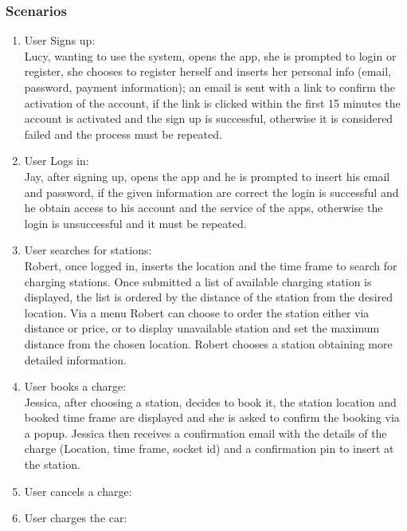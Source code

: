 \subsubsection{Scenarios}
\begin{enumerate}[label=S\arabic*]
      \item User Signs up:\\
            Lucy, wanting to use the system, opens the app, she is prompted to login or register,
            she chooses to register herself and inserts her personal info (email, password, payment information);
            an email is sent with a link to confirm the activation of the account, if the link is clicked within
            the first 15 minutes the account is activated and the sign up is successful,
            otherwise it is considered failed and the process must be repeated.
      \item User Logs in:\\
            Jay, after signing up, opens the app and he is prompted to insert his email and password,
            if the given information are correct the login is successful and he obtain access to his account
            and the service of the apps, otherwise the login is unsuccessful and it must be repeated.
      \item User searches for stations:\\
            Robert, once logged in, inserts the location and the time frame to search for charging stations.
            Once submitted a list of available charging station is displayed, the list is ordered by the distance of the station
            from the desired location. Via a menu Robert can choose to order the station either via distance or price,
            or to display unavailable station and set the maximum distance from the chosen location.
            Robert chooses a station obtaining more detailed information.
      \item User books a charge:\\
            Jessica, after choosing a station, decides to book it, the station location and booked time frame are displayed
            and she is asked to confirm the booking via a popup. Jessica then receives a confirmation email with the details
            of the charge (Location, time frame, socket id) and a confirmation pin to insert at the station.
      \item User cancels a charge:\\
      \item User charges the car:\\

\end{enumerate}
